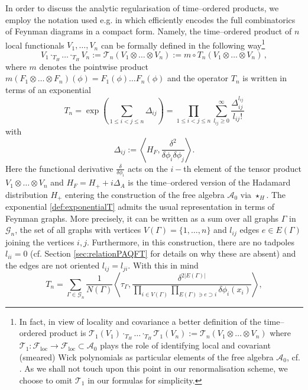 \documentclass[a4paper,10pt,twoside]{article}
\numberwithin{equation}{section}
\newcounter{and}
\def\A{\mathcal{A}}
\def\F{\mathcal{F}}
\def\loc{\mathrm{loc}}
\def\beq{\begin{equation}}
\def\eeq{\end{equation}}
\theoremstyle{plain}
\theoremstyle{definition}
\begin{document}
In order to discuss the analytic regularisation of time--ordered products, we employ the notation used e.g. in \cite{dfkr} which efficiently encodes the full combinatorics of Feynman diagrams in a compact form. Namely, the time--ordered product of $n$ local functionals $V_1, \dots, V_n$ can be formally defined in the following way\footnote{\label{foot:T1}In fact, in view of locality and covariance a better definition of the time--ordered product is $\mathcal{T}_1(V_1)\cdot_{T_H}  \dots \cdot_{T_H}    \mathcal{T}_1(V_n)    
:=
\mathcal{T}_n(V_1\otimes \dots \otimes V_n) $ where $\mathcal{T}_1:\F_\loc\to\F_\loc\subset\A_0$ plays the role of identifying local and covariant (smeared) Wick polynomials as particular elements of the free algebra $\A_0$, cf. \cite{Hollands:2004yh}. As we shall not touch upon this point in our renormalisation scheme, we choose to omit $\mathcal{T}_1$ in our formulas for simplicity.}
\begin{equation}\label{eq:time-ordered-product}
V_1\cdot_{T_H}  \dots \cdot_{T_H}    V_n    
:=
\mathcal{T}_n(V_1\otimes \dots \otimes V_n) 
:=  m \circ T_n (V_1\otimes \dots \otimes V_n)\,,
\end{equation}
where $m$ denotes the pointwise product $m(F_1\otimes \dots \otimes F_n)(\phi) = F_1(\phi)\dots F_n(\phi)$
and the operator $T_n$ is written in terms of an exponential 
%
\beq\label{def:exponentialT}
T_n = \exp\left(\sum_{1\leq i<j \leq n}\Delta_{ij}\right)= \prod_{1\leq i<j\leq n} \sum_{l_{ij} \geq 0}^\infty  \frac{\Delta_{ij}^{l_{ij}}}{l_{ij}!}
\eeq
%
with
%
\beq\label{def:exponentialT2}
\Delta_{ij} :=   \left\langle H_F, \frac{\delta^2}{\delta \phi_i \delta \phi_j} \right\rangle.
\eeq
%
Here the functional derivative $\frac{\delta}{\delta \phi_i}$ acts on the $i-$th element of the tensor product 
$V_1\otimes \dots \otimes V_n$ and $H_F=H_++i\Delta_A$ is the time--ordered version of the Hadamard distribution $H_+$ entering the construction of the free algebra $\A_0$ via $\star_H$.
The exponential \eqref{def:exponentialT} admits the usual representation in terms of Feynman graphs. More precisely, it can be written as a sum over all graphs $\Gamma$ in $\mathcal{G}_n$, the set of all graphs with vertices $V(\Gamma)= \{ 1,\dots, n\}$ and $l_{ij}$ edges $e\in E(\Gamma)$  joining the vertices $i,j$. Furthermore, in this construction, there are no tadpoles $l_{ii}=0$ (cf. Section \ref{sec:relationPAQFT} for details on why these are absent) and the edges are not oriented $l_{ij}=l_{ji}$. With this in mind 
\begin{equation}\label{eq:tau-gamma}
T_n = \sum_{\Gamma\in \mathcal{G}_n}  \frac{1}{N(\Gamma)}    \left\langle  \tau_\Gamma  , \frac{\delta^{2|E(\Gamma)|}}{  \prod_{i \in V(\Gamma)} \prod_{E(\Gamma)\ni e \supset i}    \delta \phi_i(x_{i}) } \right\rangle,
\end{equation}
\end{document}
